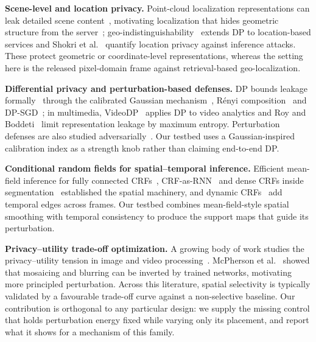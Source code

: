 \documentclass[10pt,journal]{IEEEtran}
\begin{document}
\textbf{Scene-level and location privacy.}
Point-cloud localization representations can leak detailed scene
content~\cite{pittaluga2019revealing}, motivating localization that hides
geometric structure from the server~\cite{speciale2019privacy};
geo-indistinguishability~\cite{andres2013geo} extends DP to location-based
services and Shokri et al.~\cite{shokri2011quantifying} quantify location
privacy against inference attacks. These protect geometric or coordinate-level
representations, whereas the setting here is the released pixel-domain frame
against retrieval-based geo-localization.

\textbf{Differential privacy and perturbation-based defenses.}
DP bounds leakage formally~\cite{dwork2014algorithmic} through the calibrated
Gaussian mechanism~\cite{balle2018improving}, R\'{e}nyi
composition~\cite{mironov2017renyi} and DP-SGD~\cite{abadi2016deep}; in
multimedia, VideoDP~\cite{wang2020videodp} applies DP to video analytics and
Roy and Boddeti~\cite{roy2019mitigating} limit representation leakage by
maximum entropy. Perturbation defenses are also studied
adversarially~\cite{goodfellow2015explaining,madry2018towards}. Our testbed
uses a Gaussian-inspired calibration index as a strength knob rather than
claiming end-to-end DP.

\textbf{Conditional random fields for spatial--temporal inference.}
Efficient mean-field inference for fully connected
CRFs~\cite{krahenbuhl2011efficient}, CRF-as-RNN~\cite{zheng2015conditional}
and dense CRFs inside segmentation~\cite{chen2017deeplab} established the
spatial machinery, and dynamic CRFs~\cite{wang2005dynamic} add temporal edges
across frames. Our testbed combines mean-field-style spatial smoothing with
temporal consistency to produce the support maps that guide its perturbation.

\textbf{Privacy--utility trade-off optimization.}
A growing body of work studies the privacy--utility tension in image and video processing~\cite{wu2018towards}. McPherson et al.~\cite{mcpherson2016defeating} showed that mosaicing and blurring can be inverted by trained networks, motivating more principled perturbation. Across this literature, spatial selectivity is typically validated by a favourable trade-off curve against a non-selective baseline. Our contribution is orthogonal to any particular design: we supply the missing control that holds perturbation energy fixed while varying only its placement, and report what it shows for a mechanism of this family.
\end{document}
